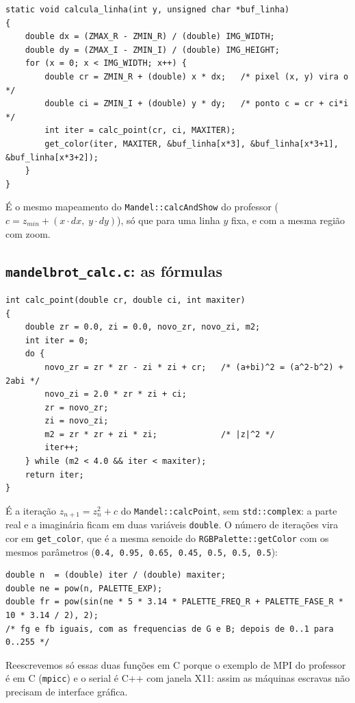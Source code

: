 \documentclass[a4paper,11pt]{article}
\begin{document}
\begin{lstlisting}
static void calcula_linha(int y, unsigned char *buf_linha)
{
    double dx = (ZMAX_R - ZMIN_R) / (double) IMG_WIDTH;
    double dy = (ZMAX_I - ZMIN_I) / (double) IMG_HEIGHT;
    for (x = 0; x < IMG_WIDTH; x++) {
        double cr = ZMIN_R + (double) x * dx;   /* pixel (x, y) vira o  */
        double ci = ZMIN_I + (double) y * dy;   /* ponto c = cr + ci*i  */
        int iter = calc_point(cr, ci, MAXITER);
        get_color(iter, MAXITER, &buf_linha[x*3], &buf_linha[x*3+1], &buf_linha[x*3+2]);
    }
}
\end{lstlisting}

É o mesmo mapeamento do \texttt{Mandel::calcAndShow} do professor ($c = z_{min} + (x \cdot dx,\; y \cdot dy)$), só que para uma linha $y$ fixa, e com a mesma região com zoom.

\subsection{\texttt{mandelbrot\_calc.c}: as fórmulas}

\begin{lstlisting}
int calc_point(double cr, double ci, int maxiter)
{
    double zr = 0.0, zi = 0.0, novo_zr, novo_zi, m2;
    int iter = 0;
    do {
        novo_zr = zr * zr - zi * zi + cr;   /* (a+bi)^2 = (a^2-b^2) + 2abi */
        novo_zi = 2.0 * zr * zi + ci;
        zr = novo_zr;
        zi = novo_zi;
        m2 = zr * zr + zi * zi;             /* |z|^2 */
        iter++;
    } while (m2 < 4.0 && iter < maxiter);
    return iter;
}
\end{lstlisting}

É a iteração $z_{n+1} = z_n^2 + c$ do \texttt{Mandel::calcPoint}, sem \texttt{std::complex}: a parte real e a imaginária ficam em duas variáveis \texttt{double}. O número de iterações vira cor em \texttt{get\_color}, que é a mesma senoide do \texttt{RGBPalette::getColor} com os mesmos parâmetros (\texttt{0.4, 0.95, 0.65, 0.45, 0.5, 0.5, 0.5}):

\begin{lstlisting}
double n  = (double) iter / (double) maxiter;
double ne = pow(n, PALETTE_EXP);
double fr = pow(sin(ne * 5 * 3.14 * PALETTE_FREQ_R + PALETTE_FASE_R * 10 * 3.14 / 2), 2);
/* fg e fb iguais, com as frequencias de G e B; depois de 0..1 para 0..255 */
\end{lstlisting}

Reescrevemos só essas duas funções em C porque o exemplo de MPI do professor é em C (\texttt{mpicc}) e o serial é C++ com janela X11: assim as máquinas escravas não precisam de interface gráfica.
\end{document}
